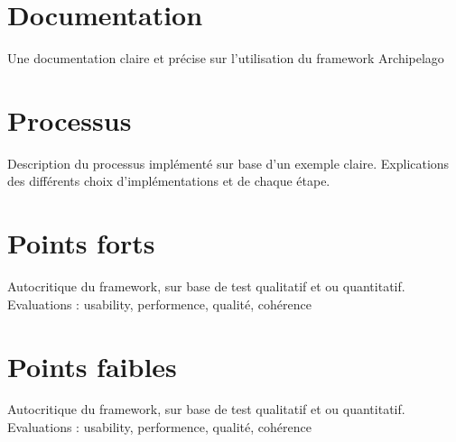 \documentclass[a4paper,12pt,twoside, fleqn]{report}
\begin{document}
\section{Documentation}
Une documentation claire et précise sur l'utilisation du framework Archipelago
\section{Processus}
Description du processus implémenté sur base d'un exemple claire. Explications des différents choix d'implémentations et de chaque étape.
\section{Points forts}
Autocritique du framework, sur base de test qualitatif et ou quantitatif. Evaluations : usability, performence, qualité, cohérence
\section{Points faibles}
Autocritique du framework, sur base de test qualitatif et ou quantitatif.
Evaluations : usability, performence, qualité, cohérence
\end{document}
